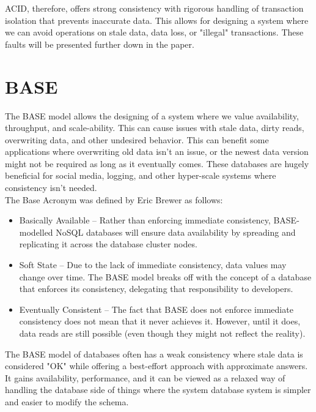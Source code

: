 \documentclass[a4paper,10pt,titlepage]{report}
\begin{document}
    ACID, therefore, offers strong consistency with rigorous handling of transaction isolation that prevents inaccurate data. This allows for designing a system where we can avoid operations on stale data, data loss, or "illegal" transactions. These faults will be presented further down in the paper.


    \section{BASE}
    The BASE model allows the designing of a system where we value availability, throughput, and scale-ability. This can cause issues with stale data, dirty reads, overwriting data, and other undesired behavior. This can benefit some applications where overwriting old data isn't an issue, or the newest data version might not be required as long as it eventually comes. These databases are hugely beneficial for social media, logging, and other hyper-scale systems where consistency isn't needed.\\
    \vspace{5mm}
    The Base Acronym was defined by Eric Brewer\cite{brewer2000towards} as follows:

    \begin{itemize}
        \item Basically Available – Rather than enforcing immediate consistency, BASE-modelled NoSQL databases will ensure data availability by spreading and replicating it across the database cluster nodes.
        \item Soft State – Due to the lack of immediate consistency, data values may change over time. The BASE model breaks off with the concept of a database that enforces its consistency, delegating that responsibility to developers.
        \item Eventually Consistent – The fact that BASE does not enforce immediate consistency does not mean that it never achieves it. However, until it does, data reads are still possible (even though they might not reflect the reality).
    \end{itemize}

    The BASE model of databases often has a weak consistency where stale data is considered "OK" while offering a best-effort approach with approximate answers. It gains availability, performance, and it can be viewed as a relaxed way of handling the database side of things where the system database system is simpler and easier to modify the schema.
\end{document}
